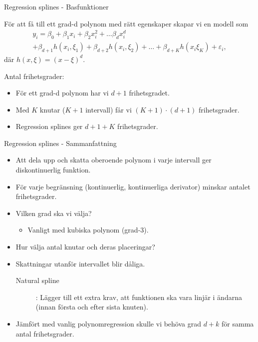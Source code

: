 \documentclass[10pt,english]{beamer}
\begin{document}
\begin{frame}{Regression splines - Basfunktioner}

    För att få till ett grad-d polynom med rätt egenskaper skapar vi en modell som
    \begin{multline*}
        y_i = \beta_0 + \beta_1 x_i + \beta_2 x_i^2 + \ldots \beta_d x_i^d \\
        + \beta_{d+1} h(x_i, \xi_1) + \beta_{d+2} h(x_i, \xi_2) + \ldots + \beta_{d+K} h(x_i \xi_K) + \varepsilon_i,
    \end{multline*}
    där $h(x, \xi) = (x - \xi)^d$.

    Antal frihetsgrader:
    \begin{itemize}
        \item För ett grad-d polynom har vi $d+1$ frihetsgradet.
        \item Med $K$ knutar ($K+1$ intervall) får vi $(K+1)\cdot(d+1)$ frihetsgrader.
        \item Regression splines ger $d + 1 + K$ frihetsgrader.
    \end{itemize}
    
\end{frame}

\begin{frame}{Regression splines - Sammanfattning}

    \begin{itemize}
        \item Att dela upp och skatta oberoende polynom i varje intervall ger diskontinuerlig funktion.
        \item För varje begränsning (kontinuerlig, kontinuerliga derivator) minskar antalet frihetsgrader.
        \item Vilken grad ska vi välja?
        \begin{itemize}
            \item Vanligt med kubiska polynom (grad-3).
        \end{itemize}
        \item Hur välja antal knutar och deras placeringar?
        \item Skattningar utanför intervallet blir dåliga.
        \begin{description}
            \item[Natural spline]: Lägger till ett extra krav, att funktionen ska vara linjär i ändarna (innan första och efter sista knuten). 
        \end{description}
        \item Jämfört med vanlig polynomregression skulle vi behöva grad $d+k$ för samma antal frihetsgrader.
    \end{itemize}
    
\end{frame}
\end{document}
